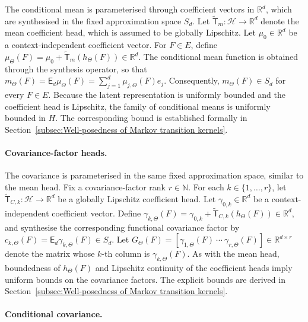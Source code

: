 The conditional mean is parameterised through coefficient vectors in \(\mathbb R^d\), which are synthesised in the fixed approximation space \(S_d\). Let \(\widetilde{\mathsf T}_m:\mathcal H\to\mathbb R^d\) denote the mean coefficient head, which is assumed to be globally Lipschitz. Let \(\mu_0\in\mathbb R^d\) be a context-independent coefficient vector. For \(F\in E\), define \(\mu_\Theta(F)=\mu_0+\widetilde{\mathsf T}_m(h_\Theta(F))\in\mathbb R^d\).
The conditional mean function is obtained through the synthesis operator, so that \(m_\Theta(F)=\mathsf E_d\mu_\Theta(F)=\sum_{j=1}^d\mu_{j,\Theta}(F)e_j\). Consequently, \(m_\Theta(F)\in S_d\) for every \(F\in E\).
Because the latent representation is uniformly bounded and the coefficient head is Lipschitz, the family of conditional means is uniformly bounded in \(H\). The corresponding bound is established formally in Section~\ref{subsec:Well-posedness of Markov transition kernels}.

\paragraph{Covariance-factor heads.}

The covariance is parameterised in the same fixed approximation space, similar to the mean head. Fix a covariance-factor rank \(r\in\mathbb N\). For each \(k\in\{1,\ldots,r\}\), let \(\widetilde{\mathsf T}_{C,k}:\mathcal H\to\mathbb R^d\) be a globally Lipschitz coefficient head. Let \(\gamma_{0,k}\in\mathbb R^d\) be a context-independent coefficient vector. Define \(\gamma_{k,\Theta}(F)=\gamma_{0,k}+\widetilde{\mathsf T}_{C,k}(h_\Theta(F))\in\mathbb R^d\), and synthesise the corresponding functional covariance factor by \(c_{k,\Theta}(F)=\mathsf E_d\gamma_{k,\Theta}(F)\in S_d\).
Let \(G_\Theta(F)=[\gamma_{1,\Theta}(F)\ \cdots\ \gamma_{r,\Theta}(F)]\in\mathbb R^{d\times r}\) denote the matrix whose \(k\)-th column is \(\gamma_{k,\Theta}(F)\). As with the mean head, boundedness of \(h_\Theta(F)\) and Lipschitz continuity of the coefficient heads imply uniform bounds on the covariance factors. The explicit bounds are derived in Section~\ref{subsec:Well-posedness of Markov transition kernels}.

\paragraph{Conditional covariance.}

